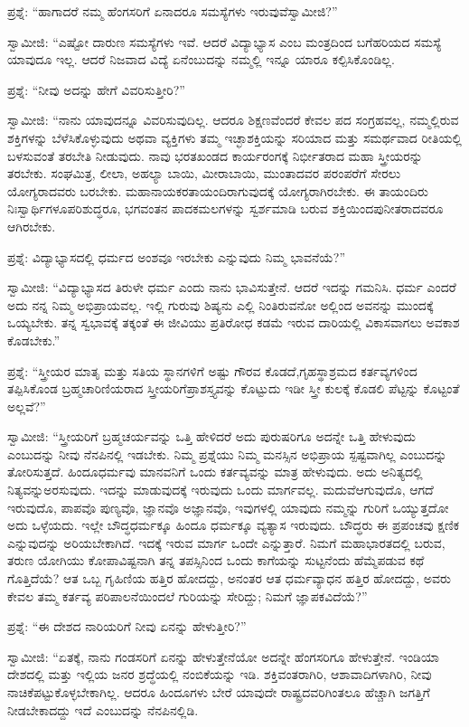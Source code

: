ಪ್ರಶ್ನೆ: “ಹಾಗಾದರೆ ನಮ್ಮ ಹೆಂಗಸರಿಗೆ ಏನಾದರೂ ಸಮಸ್ಯೆಗಳು ಇರುವುವೆ\break ಸ್ವಾಮೀಜಿ?”

ಸ್ವಾಮೀಜಿ: “ಎಷ್ಟೋ ದಾರುಣ ಸಮಸ್ಯೆಗಳು ಇವೆ. ಆದರೆ ವಿದ್ಯಾಭ್ಯಾಸ ಎಂಬ ಮಂತ್ರದಿಂದ ಬಗೆಹರಿಯದ ಸಮಸ್ಯೆ ಯಾವುದೂ ಇಲ್ಲ. ಆದರೆ ನಿಜವಾದ ವಿದ್ಯೆ ಏನೆಂಬುದನ್ನು ನಮ್ಮಲ್ಲಿ ಇನ್ನೂ ಯಾರೂ ಕಲ್ಪಿಸಿಕೊಂಡಿಲ್ಲ.

ಪ್ರಶ್ನೆ: “ನೀವು ಅದನ್ನು ಹೇಗೆ ವಿವರಿಸುತ್ತೀರಿ?”

ಸ್ವಾಮೀಜಿ: “ನಾನು ಯಾವುದನ್ನೂ ವಿವರಿಸುವುದಿಲ್ಲ. ಆದರೂ ಶಿಕ್ಷಣವೆಂದರೆ ಕೇವಲ ಪದ ಸಂಗ್ರಹವಲ್ಲ, ನಮ್ಮಲ್ಲಿರುವ ಶಕ್ತಿಗಳನ್ನು ಬೆಳೆಸಿಕೊಳ್ಳುವುದು ಅಥವಾ ವ್ಯಕ್ತಿಗಳು ತಮ್ಮ ಇಚ್ಛಾಶಕ್ತಿಯನ್ನು ಸರಿಯಾದ ಮತ್ತು ಸಮರ್ಥವಾದ ರೀತಿಯಲ್ಲಿ ಬಳಸುವಂತೆ ತರಬೇತಿ ನೀಡುವುದು. ನಾವು ಭರತಖಂಡದ ಕಾರ್ಯರಂಗಕ್ಕೆ ನಿರ್ಭೀತರಾದ ಮಹಾ ಸ್ತ್ರೀಯರನ್ನು ತರಬೇಕು. ಸಂಘಮಿತ್ರ, ಲೀಲಾ, ಅಹಲ್ಯಾ ಬಾಯಿ, ಮೀರಾಬಾಯಿ, ಮುಂತಾದವರ ಪರಂಪರೆಗೆ ಸೇರಲು ಯೋಗ್ಯರಾದವರು ಬರಬೇಕು. ಮಹಾನಾಯಕರ\break ತಾಯಂದಿರಾಗುವುದಕ್ಕೆ ಯೋಗ್ಯರಾಗಿರಬೇಕು. ಈ ತಾಯಂದಿರು ನಿಃಸ್ವಾರ್ಥಿಗಳೂ\break ಪರಿಶುದ್ಧರೂ, ಭಗವಂತನ ಪಾದಕಮಲಗಳನ್ನು ಸ್ವರ್ಶಮಾಡಿ ಬರುವ ಶಕ್ತಿಯಿಂದ\break ಪುನೀತರಾದವರೂ ಆಗಿರಬೇಕು.

ಪ್ರಶ್ನೆ: ವಿದ್ಯಾಭ್ಯಾಸದಲ್ಲಿ ಧರ್ಮದ ಅಂಶವೂ ಇರಬೇಕು ಎನ್ನುವುದು ನಿಮ್ಮ ಭಾವನೆಯೆ?”

ಸ್ವಾಮೀಜಿ: “ವಿದ್ಯಾಭ್ಯಾಸದ ತಿರುಳೇ ಧರ್ಮ ಎಂದು ನಾನು ಭಾವಿಸುತ್ತೇನೆ. ಆದರೆ ಇದನ್ನು ಗಮನಿಸಿ. ಧರ್ಮ ಎಂದರೆ ಅದು ನನ್ನ ನಿಮ್ಮ ಅಭಿಪ್ರಾಯವಲ್ಲ. ಇಲ್ಲಿ ಗುರುವು ಶಿಷ್ಯನು ಎಲ್ಲಿ ನಿಂತಿರುವನೋ ಅಲ್ಲಿಂದ ಅವನನ್ನು ಮುಂದಕ್ಕೆ ಒಯ್ಯಬೇಕು. ತನ್ನ ಸ್ವಭಾವಕ್ಕೆ ತಕ್ಕಂತೆ ಈ ಜೀವಿಯು ಪ್ರತಿರೋಧ ಕಡಮೆ ಇರುವ ದಾರಿಯಲ್ಲಿ ವಿಕಾಸವಾಗಲು ಅವಕಾಶ ಕೊಡಬೇಕು.”

ಪ್ರಶ್ನೆ: “ಸ್ತ್ರೀಯರ ಮಾತೃ ಮತ್ತು ಸತಿಯ ಸ್ಥಾನಗಳಿಗೆ ಅಷ್ಟು ಗೌರವ ಕೊಡದೆ,\break ಗೃಹಸ್ಥಾಶ್ರಮದ ಕರ್ತವ್ಯಗಳಿಂದ ತಪ್ಪಿಸಿಕೊಂಡ ಬ್ರಹ್ಮಚಾರಿಣಿಯರಾದ ಸ್ತ್ರೀಯರಿಗೆ\break ಪ್ರಾಶಸ್ತ್ಯವನ್ನು ಕೊಟ್ಟುದು ಇಡೀ ಸ್ತ್ರೀ ಕುಲಕ್ಕೆ ಕೊಡಲಿ ಪೆಟ್ಟನ್ನು ಕೊಟ್ಟಂತೆ ಅಲ್ಲವೆ?”

ಸ್ವಾಮೀಜಿ: “ಸ್ತ್ರೀಯರಿಗೆ ಬ್ರಹ್ಮಚರ್ಯವನ್ನು ಒತ್ತಿ ಹೇಳಿದರೆ ಅದು ಪುರುಷರಿಗೂ ಅದನ್ನೇ ಒತ್ತಿ ಹೇಳುವುದು ಎಂಬುದನ್ನು ನೀವು ನೆನಪಿನಲ್ಲಿ ಇಡಬೇಕು. ನಿಮ್ಮ ಪ್ರಶ್ನೆಯು ನಿಮ್ಮ ಮನಸ್ಸಿನ ಅಭಿಪ್ರಾಯ ಸ್ಪಷ್ಟವಾಗಿಲ್ಲ ಎಂಬುದನ್ನು ತೋರಿಸುತ್ತದೆ. ಹಿಂದೂಧರ್ಮವು ಮಾನವನಿಗೆ ಒಂದು ಕರ್ತವ್ಯವನ್ನು ಮಾತ್ರ ಹೇಳುವುದು. ಅದು ಅನಿತ್ಯದಲ್ಲಿ ನಿತ್ಯವನ್ನು\break ಅರಸುವುದು. ಇದನ್ನು ಮಾಡುವುದಕ್ಕೆ ಇರುವುದು ಒಂದು ಮಾರ್ಗವಲ್ಲ. ಮದುವೆ\break ಆಗುವುದೊ, ಆಗದೆ ಇರುವುದೊ, ಪಾಪವೊ ಪುಣ್ಯವೊ, ಜ್ಞಾನವೊ ಅಜ್ಞಾನವೊ, ಇವುಗಳಲ್ಲಿ ಯಾವುದು ನಮ್ಮನ್ನು ಗುರಿಗೆ ಒಯ್ಯುತ್ತದೋ ಅದು ಒಳ್ಳೆಯದು. ಇಲ್ಲೇ ಬೌದ್ಧಧರ್ಮಕ್ಕೂ ಹಿಂದೂ ಧರ್ಮಕ್ಕೂ ವ್ಯತ್ಯಾಸ ಇರುವುದು. ಬೌದ್ಧರು ಈ ಪ್ರಪಂಚವು ಕ್ಷಣಿಕ ಎನ್ನುವುದನ್ನು ಅರಿಯಬೇಕಾಗಿದೆ. ಇದಕ್ಕೆ ಇರುವ ಮಾರ್ಗ ಒಂದೇ ಎನ್ನುತ್ತಾರೆ. ನಿಮಗೆ ಮಹಾಭಾರತದಲ್ಲಿ ಬರುವ, ತರುಣ ಯೋಗಿಯು ಕೋಪಾವಿಷ್ಟನಾಗಿ ತನ್ನ ತಪಸ್ಸಿನಿಂದ ಒಂದು ಕಾಗೆಯನ್ನು ಸುಟ್ಟನೆಂದು ಹೆಮ್ಮೆಪಡುವ ಕಥೆ ಗೊತ್ತಿದೆಯೆ? ಆತ ಒಬ್ಬ ಗೃಹಿಣಿಯ ಹತ್ತಿರ ಹೋದದ್ದು, ಅನಂತರ ಆತ ಧರ್ಮವ್ಯಾಧನ ಹತ್ತಿರ ಹೋದದ್ದು, ಅವರು ಕೇವಲ ತಮ್ಮ ಕರ್ತವ್ಯ ಪರಿಪಾಲನೆಯಿಂದಲೆ ಗುರಿಯನ್ನು ಸೇರಿದ್ದು; ನಿಮಗೆ ಜ್ಞಾಪಕವಿದೆಯೆ?”

ಪ್ರಶ್ನೆ: “ಈ ದೇಶದ ನಾರಿಯರಿಗೆ ನೀವು ಏನನ್ನು ಹೇಳುತ್ತೀರಿ?”

ಸ್ವಾಮೀಜಿ: “ಏತಕ್ಕೆ, ನಾನು ಗಂಡಸರಿಗೆ ಏನನ್ನು ಹೇಳುತ್ತೇನೆಯೋ ಅದನ್ನೇ ಹೆಂಗಸರಿಗೂ ಹೇಳುತ್ತೇನೆ. ಇಂಡಿಯಾ ದೇಶದಲ್ಲಿ ಮತ್ತು ಇಲ್ಲಿಯ ಜನರ ಶ್ರದ್ಧೆಯಲ್ಲಿ ನಂಬಿಕೆಯನ್ನು ಇಡಿ. ಶಕ್ತಿವಂತರಾಗಿರಿ, ಆಶಾವಾದಿಗಳಾಗಿರಿ, ನೀವು ನಾಚಿಕೆಪಟ್ಟುಕೊಳ್ಳಬೇಕಾಗಿಲ್ಲ. ಆದರೂ ಹಿಂದೂಗಳು ಬೇರೆ ಯಾವುದೇ ರಾಷ್ಟ್ರದವರಿಗಿಂತಲೂ ಹೆಚ್ಚಾಗಿ ಜಗತ್ತಿಗೆ ನೀಡಬೇಕಾದದ್ದು ಇದೆ ಎಂಬುದನ್ನು ನೆನಪಿನಲ್ಲಿಡಿ.

